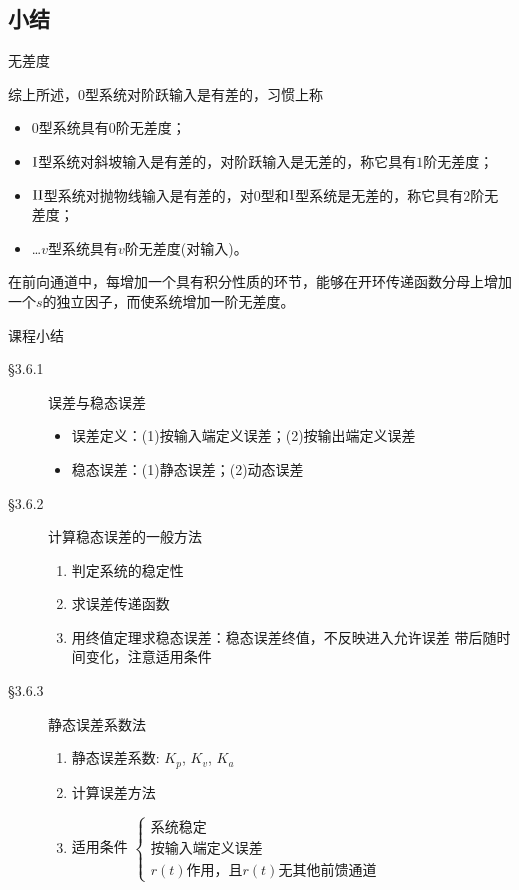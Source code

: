 \documentclass[handout,cjkutf8,table,aspectratio=1610]{beamer} %
\begin{document}
\subsection{小结}
\begin{frame}{无差度}
	\begin{block}{}
	综上所述，$0$型系统对阶跃输入是有差的，习惯上称
	\begin{itemize}
		\item $0$型系统具有$0$阶无差度；
		\item $\rm I$型系统对斜坡输入是有差的，对阶跃输入是无差的，称它具有$1$阶无差度；
		\item $\rm II$型系统对抛物线输入是有差的，对$0$型和$\rm I$型系统是无差的，称它具有$2$阶无差度；
		\item …$v$型系统具有$v$阶无差度(对输入)。  
	\end{itemize}
	\end{block}
	\begin{block}{}
	在前向通道中，每增加一个具有积分性质的环节，能够在开环传递函数分母上增加一个$s$的独立因子，而使系统增加一阶无差度。 
	\end{block}
\end{frame}

\begin{frame}{课程小结}
\begin{description}
\item[\S3.6.1]\alert{误差与稳态误差}
\begin{itemize}
\item 误差定义：(1)按输入端定义误差；(2)按输出端定义误差
\item 稳态误差：(1)静态误差；(2)动态误差
\end{itemize}
\item[\S3.6.2]\alert{计算稳态误差的一般方法}
\begin{enumerate}
\item 判定系统的稳定性 
\item 求误差传递函数 
\item 用终值定理求稳态误差：稳态误差终值，不反映进入允许误差  带后随时间变化，注意适用条件
\end{enumerate}
\item[\S3.6.3]\alert{静态误差系数法}
\begin{enumerate}
\item  静态误差系数: $K_p$, $K_v$, $K_a$
\item 计算误差方法
\item 适用条件
$\begin{cases}
\text{系统稳定}\\
\text{按输入端定义误差}\\
r(t)\text{作用，且}r(t)\text{无其他前馈通道} 
\end{cases}$
\end{enumerate}
\end{description}
\end{frame}
\end{document}
